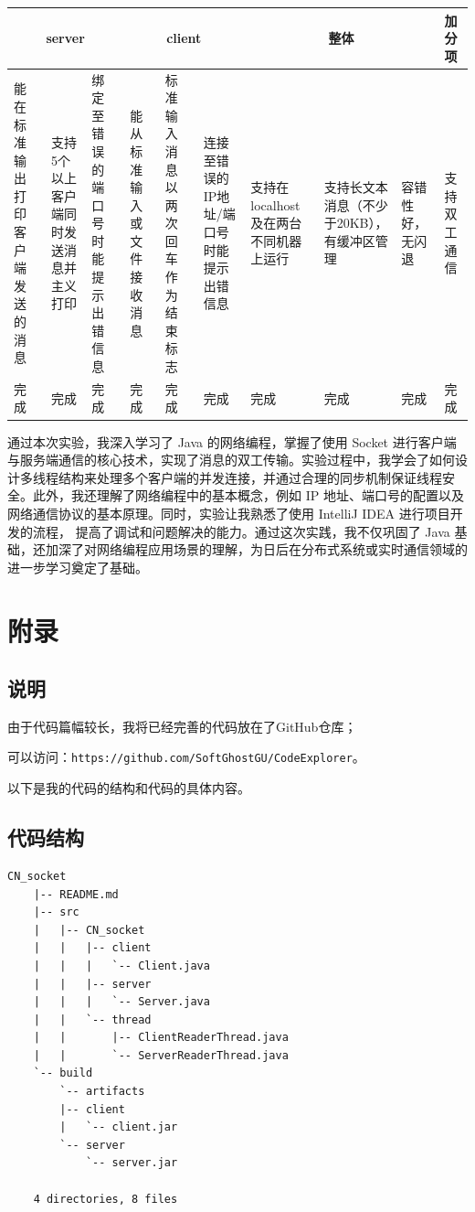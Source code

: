 \documentclass{article}
\begin{document}
	\begin{table}[!ht]
		\centering
		\begin{tabular}{|p{1.4cm}|p{1.4cm}|p{1.4cm}|p{1.4cm}|p{1.4cm}|p{1.4cm}|p{1.4cm}|p{1.4cm}|p{1.4cm}|p{1.4cm}|}
			\hline
			\multicolumn{3}{|c|}{server} & \multicolumn{3}{|c|}{client} & \multicolumn{3}{|c|}{整体} & 加分项 \\ \hline
			能在标准输出打印客户端发送的消息 & 支持5个以上客户端同时发送消息并主义打印 & 绑定至错误的端口号时能提示出错信息 & 能从标准输入或文件接收消息 & 标准输入消息以两次回车作为结束标志 & 连接至错误的IP地址/端口号时能提示出错信息 & 支持在localhost及在两台不同机器上运行 & 支持长文本消息（不少于20KB），有缓冲区管理 & 容错性好，无闪退 & 支持双工通信 \\ \hline
			完成 & 完成 & 完成 & 完成 & 完成 & 完成 & 完成 & 完成 & 完成 & 完成 \\ \hline
		\end{tabular}
	\end{table}
	
	通过本次实验，我深入学习了 Java 的网络编程，掌握了使用 Socket 进行客户端与服务端通信的核心技术，实现了消息的双工传输。实验过程中，我学会了如何设计多线程结构来处理多个客户端的并发连接，并通过合理的同步机制保证线程安全。此外，我还理解了网络编程中的基本概念，例如 IP 地址、端口号的配置以及网络通信协议的基本原理。同时，实验让我熟悉了使用 IntelliJ IDEA 进行项目开发的流程， 提高了调试和问题解决的能力。通过这次实践，我不仅巩固了 Java 基础，还加深了对网络编程应用场景的理解，为日后在分布式系统或实时通信领域的进一步学习奠定了基础。
	
	\section{附录}
	
	\subsection{说明}
	
	由于代码篇幅较长，我将已经完善的代码放在了GitHub仓库；
	
	可以访问：\texttt{https://github.com/SoftGhostGU/CodeExplorer}。
	
	以下是我的代码的结构和代码的具体内容。
	
	\subsection{代码结构}
	
	\begin{lstlisting}[numbers=none]
    CN_socket
    |-- README.md
    |-- src
    |   |-- CN_socket
    |   |   |-- client
    |   |   |   `-- Client.java
    |   |   |-- server
    |   |   |   `-- Server.java
    |   |   `-- thread
    |   |       |-- ClientReaderThread.java
    |   |       `-- ServerReaderThread.java
    `-- build
        `-- artifacts
        |-- client
        |   `-- client.jar
        `-- server
            `-- server.jar
    
    4 directories, 8 files
	\end{lstlisting}
	
\end{document}
